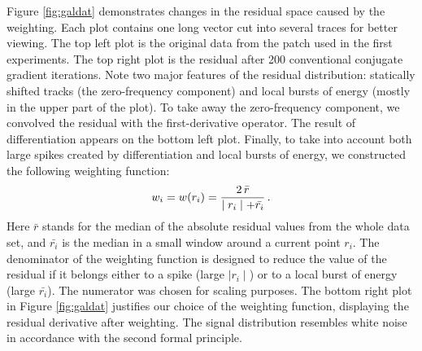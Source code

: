 \par
Figure \ref{fig:galdat} demonstrates changes in the residual space caused by
the weighting. 
Each plot contains one long vector cut into several traces for better
viewing. 
The top left plot is the original data
from the patch used in the first experiments. The top right plot is
the residual after 200 
conventional conjugate gradient iterations. Note two major features of the
residual distribution: statically shifted tracks 
(the zero-frequency
component) and local bursts of energy (mostly in the upper part of the
plot). To take away the zero-frequency component, we convolved the
residual with 
the first-derivative operator. The result of differentiation appears on the
bottom left plot. 
Finally, to take into account both large spikes created by differentiation and
local bursts of energy, we constructed the following weighting function:
\begin{equation} w_i = w(r_i) = {{2\,\bar{r}} \over {\mid r_i \mid +
\bar{r_i}}} \,. 
\label{eqn:weight} \end{equation} 
Here $\bar{r}$ stands for the median of the absolute
residual values from the whole data set, and $\bar{r_i}$ is the
median in a 
small window around a current point $r_i$. The denominator of the weighting
function is designed to reduce the value of the residual if it belongs
either to 
a spike (large $\mid r_i \mid$) or to a local burst of energy (large
$\bar{r_i}$). The numerator was chosen for scaling purposes. The
bottom right plot in Figure
\ref{fig:galdat} justifies our choice of the weighting function, displaying the
residual derivative after weighting. The signal distribution resembles white
noise in accordance with the second formal principle.

